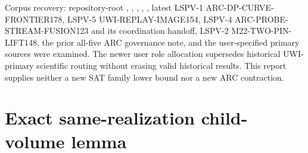\documentclass[11pt]{article}
\begin{document}
Corpus recovery: repository-root , ,
, ,
, latest
LSPV-1 ARC-DP-CURVE-FRONTIER178, LSPV-5 UWI-REPLAY-IMAGE154,
LSPV-4 ARC-PROBE-STREAM-FUSION123 and its coordination handoff,
LSPV-2 M22-TWO-PIN-LIFT148, the prior all-five ARC governance note,
and the user-specified primary sources were examined.
The newer user role allocation supersedes historical UWI-primary scientific
routing without erasing valid historical results. This report supplies neither
a new SAT family lower bound nor a new ARC contraction.

\section{Exact same-realization child-volume lemma}
\end{document}

